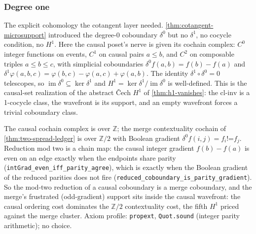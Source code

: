 \subsubsection{Degree one}

\begin{theorem}\label{thm:causal-cochain-complex}\leanok{}
The explicit cohomology the cotangent layer needed.
\cref{thm:cotangent-microsupport} introduced the degree-0 coboundary
$\delta^0$ but no $\delta^1$, no cocycle condition, no $H^1$. Here the causal
poset's nerve is given its cochain complex: $C^0$ integer functions on events,
$C^1$ on causal pairs $a \leq b$, and $C^2$ on composable triples
$a \leq b \leq c$, with simplicial coboundaries
$\delta^0 f(a,b) = f(b) - f(a)$ and
$\delta^1 \varphi(a,b,c) = \varphi(b,c) - \varphi(a,c) + \varphi(a,b)$.
The identity $\delta^1 \circ \delta^0 = 0$ telescopes, so
$\operatorname{im}\delta^0 \subseteq \ker\delta^1$ and
$H^1 = \ker\delta^1 / \operatorname{im}\delta^0$ is well-defined. This is the
causal-set realization of the abstract \v{C}ech $H^1$ of
\cref{thm:h1-vanishes}: the $\mathrm{cl\text{-}inv}$ is a 1-cocycle class,
the wavefront is its support, and an empty wavefront forces a trivial
coboundary class.
\end{theorem}

\begin{theorem}\label{thm:causal-mod-two-reduction}\leanok{}
The causal cochain complex is over $\mathbb Z$; the merge contextuality cochain of
\cref{thm:two-spread-ledger} is over $\mathbb Z/2$ with Boolean gradient
$\delta^0 f(i,j) = f_i \mathbin{\texttt{!=}} f_j$. Reduction mod two is a chain
map: the causal integer gradient $f(b) - f(a)$ is even on an edge exactly when the
endpoints share parity (\texttt{intGrad\_even\_iff\_parity\_agree}), which is
exactly when the Boolean gradient of the reduced parities does not fire
(\texttt{reduced\_coboundary\_is\_parity\_gradient}). So the mod-two reduction of a
causal coboundary is a merge coboundary, and the merge's frustrated (odd-gradient)
support sits inside the causal wavefront: the causal ordering cost dominates the
$\mathbb Z/2$ contextuality cost, the fifth $H^1$ priced against the merge cluster.
Axiom profile: \texttt{propext}, \texttt{Quot.sound} (integer parity arithmetic);
no choice.
\end{theorem}

